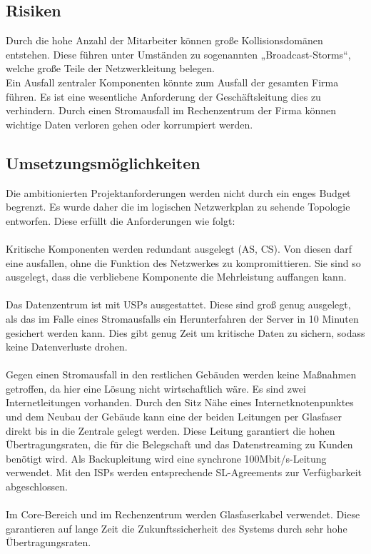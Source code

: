 \documentclass[a4paper,11pt]{article}
\begin{document}
\subsection{Risiken}
Durch die hohe Anzahl der Mitarbeiter können große Kollisionsdomänen entstehen. Diese führen unter Umständen zu sogenannten „Broadcast-Storms“, welche große Teile der Netzwerkleitung belegen.
\\
Ein Ausfall zentraler Komponenten könnte zum Ausfall der gesamten Firma führen. Es ist eine wesentliche Anforderung der Geschäftsleitung dies zu verhindern.
Durch einen Stromausfall im Rechenzentrum der Firma können wichtige Daten verloren gehen oder korrumpiert werden.

\subsection{Umsetzungsmöglichkeiten}
Die ambitionierten Projektanforderungen werden nicht durch ein enges Budget begrenzt. Es wurde daher die im logischen Netzwerkplan zu sehende Topologie entworfen. Diese erfüllt die Anforderungen wie folgt:
\\
\\
Kritische Komponenten werden redundant ausgelegt (AS, CS). Von diesen darf eine ausfallen, ohne die Funktion des Netzwerkes zu kompromittieren. Sie sind so ausgelegt, dass die verbliebene Komponente die Mehrleistung auffangen kann. 
\\
\\
Das Datenzentrum ist mit USPs ausgestattet. Diese sind groß genug ausgelegt, als das im Falle eines Stromausfalls ein Herunterfahren der Server in 10 Minuten gesichert werden kann. Dies gibt genug Zeit um kritische Daten zu sichern, sodass keine Datenverluste drohen.
\\
\\
Gegen einen Stromausfall in den restlichen Gebäuden werden keine Maßnahmen getroffen, da hier eine Lösung nicht wirtschaftlich wäre.
Es sind zwei Internetleitungen vorhanden. Durch den Sitz Nähe eines Internetknotenpunktes  und dem Neubau der Gebäude kann eine der beiden Leitungen per Glasfaser direkt bis in die Zentrale gelegt werden. Diese Leitung garantiert die hohen Übertragungsraten, die für die Belegschaft und das Datenstreaming zu Kunden benötigt wird. Als Backupleitung wird eine synchrone 100Mbit/s-Leitung verwendet. Mit den ISPs werden entsprechende SL-Agreements zur Verfügbarkeit abgeschlossen.
\\
\\
Im Core-Bereich und im Rechenzentrum werden Glasfaserkabel verwendet. Diese garantieren auf lange Zeit die Zukunftssicherheit des Systems durch sehr hohe Übertragungsraten.
\end{document}
